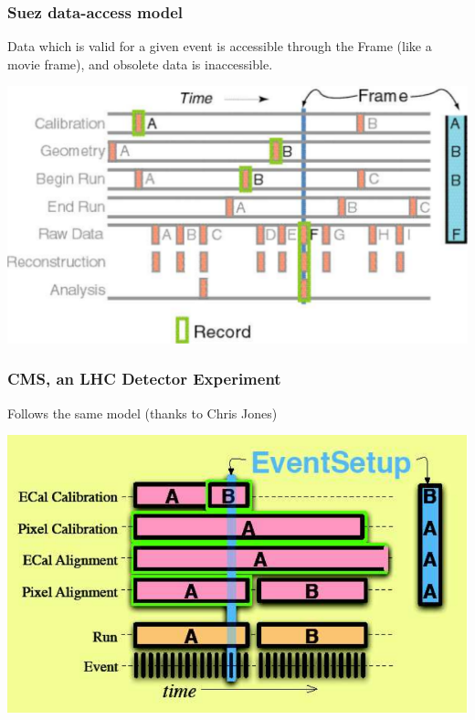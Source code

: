 \documentclass[12pt,compress]{beamer}
\begin{document}
\begin{frame}
\frametitle{Suez data-access model}

Data which is valid for a given event is accessible through the Frame
(like a movie frame), and obsolete data is inaccessible.

\begin{center}
\includegraphics[width=\linewidth]{suezfigure}
\end{center}
\end{frame}

\begin{frame}
\frametitle{CMS, an LHC Detector Experiment}

Follows the same model (thanks to Chris Jones)
\begin{center}
\includegraphics[width=\linewidth]{cmsfigure}
\end{center}
\end{frame}
\end{document}
